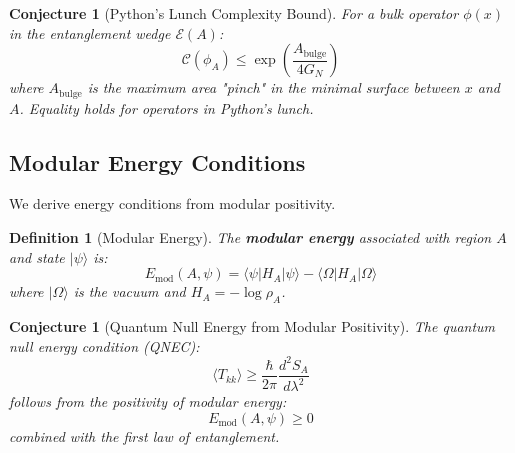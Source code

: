 \documentclass[12pt,a4paper]{article}
\newtheorem{conjecture}[theorem]{Conjecture}
\newtheorem{definition}[theorem]{Definition}
\begin{document}
\begin{conjecture}[Python's Lunch Complexity Bound]
For a bulk operator $\phi(x)$ in the entanglement wedge $\mathcal{E}(A)$:
\begin{equation}
\mathcal{C}(\phi_A) \leq \exp\left( \frac{A_{\text{bulge}}}{4G_N} \right)
\end{equation}
where $A_{\text{bulge}}$ is the maximum area "pinch" in the minimal surface between $x$ and $A$. Equality holds for operators in Python's lunch.
\end{conjecture}

\subsection{Modular Energy Conditions}

We derive energy conditions from modular positivity.

\begin{definition}[Modular Energy]
The \textbf{modular energy} associated with region $A$ and state $|\psi\rangle$ is:
\begin{equation}
E_{\text{mod}}(A, \psi) = \langle \psi | H_A | \psi \rangle - \langle \Omega | H_A | \Omega \rangle
\end{equation}
where $|\Omega\rangle$ is the vacuum and $H_A = -\log \rho_A$.
\end{definition}

\begin{conjecture}[Quantum Null Energy from Modular Positivity]
The quantum null energy condition (QNEC):
\begin{equation}
\langle T_{kk} \rangle \geq \frac{\hbar}{2\pi} \frac{d^2 S_A}{d\lambda^2}
\end{equation}
follows from the positivity of modular energy:
\begin{equation}
E_{\text{mod}}(A, \psi) \geq 0
\end{equation}
combined with the first law of entanglement.
\end{conjecture}
\end{document}
